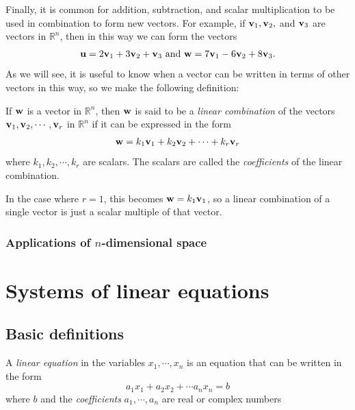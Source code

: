 \documentclass[12pt,letterpaper,reqno]{article}
\numberwithin{equation}{section}
\newcommand{\ti}[1]{\textit{#1}}
\newcommand{\fixme}[1]{{\color{orange}{[#1]}}}
\begin{document}
Finally, it is common for addition, subtraction, and scalar multiplication to be used in combination to form new vectors. For example, if ${\bf v}_1, {\bf v}_2,$ and ${\bf v}_3$ are vectors in $\mathbb{R}^n$, then in this way we can form the vectors
\begin{align*}
	{\bf u}=2{\bf v}_1+3{\bf v}_2+{\bf v}_3 \text{ and } {\bf w}=7{\bf v}_1-6{\bf v}_2+8{\bf v}_3.
\end{align*}
As we will see, it is useful to know when a vector can be written in terms of other vectors in this way, so we make the following definition:

\begin{defn}
	If ${\bf w}$ is a vector in $\mathbb{R}^n$, then ${\bf w}$ is said to be a \ti{linear combination} of the vectors ${\bf v}_1, {\bf v}_2, \cdots, {\bf v}_r$ in $\mathbb{R}^n$ if it can be expressed in the form
	\begin{align*}
		{\bf w}=k_1{\bf v}_1+k_2{\bf v}_2+\cdots +k_r{\bf v}_r
	\end{align*}
	where $k_1,k_2,\cdots,k_r$ are scalars. The scalars are called the \ti{coefficients} of the linear combination.
	
	In the case where $r=1$, this becomes ${\bf w}=k_1{\bf v}_1$, so a linear combination of a single vector is just a scalar multiple of that vector.
\end{defn}

\subsubsection{Applications of $n$-dimensional space}
\fixme{Finish.}
\section{Systems of linear equations}

\subsection{Basic definitions}
\begin{defn}\label{def:linear_equation}
	A \ti{linear equation} in the variables $x_1,\cdots, x_n$ is an equation that can be written in the form
\begin{equation}
	a_1 x_1+a_2 x_2+\cdots a_n x_n=b
\end{equation}
where $b$ and the \ti{coefficients} $a_1,\cdots, a_n$ are real or complex numbers	
\end{defn}
\end{document}

